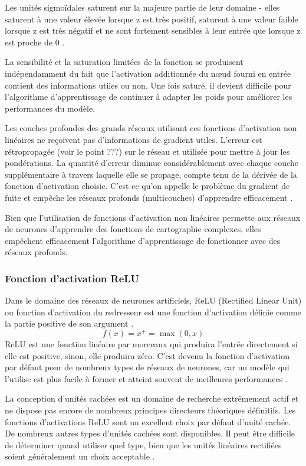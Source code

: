 	 Les unités sigmoïdales saturent sur la majeure partie de leur domaine - elles saturent à une valeur élevée lorsque z est très positif, saturent à une valeur faible lorsque z est très négatif et ne sont fortement sensibles à leur entrée que lorsque z est proche de 0 \cite{ml2008python}.
	 
	 La sensibilité et la saturation limitées de la fonction se produisent indépendamment du fait que l'activation additionnée du nœud fourni en entrée contient des informations utiles ou non. Une fois saturé, il devient difficile pour l'algorithme d'apprentissage de continuer à adapter les poids pour améliorer les performances du modèle.
	 
	 Les couches profondes des grands réseaux utilisant ces fonctions d'activation non linéaires ne reçoivent pas d'informations de gradient utiles. L'erreur est rétropropagée (voir le point ???) sur le réseau et utilisée pour mettre à jour les pondérations. La quantité d'erreur diminue considérablement avec chaque couche supplémentaire à travers laquelle elle se propage, compte tenu de la dérivée de la fonction d'activation choisie. C'est ce qu'on appelle le problème du gradient de fuite et empêche les réseaux profonds (multicouches) d'apprendre efficacement \cite{geron2017hands}.
	 
	 Bien que l'utilisation de fonctions d'activation non linéaires permette aux réseaux de neurones d'apprendre des fonctions de cartographie complexes, elles empêchent efficacement l'algorithme d'apprentissage de fonctionner avec des réseaux profonds.
	 
	
	
	\subsubsection{Fonction d'activation ReLU}
	
	Dans le domaine des réseaux de neurones artificiels, ReLU (Rectified Linear Unit) ou fonction d'activation du redresseur est une fonction d'activation définie comme la partie positive de son argument \cite{goodfellow2016deep}.
	$${\displaystyle f(x)=x^{+}=\max(0,x)}$$
	ReLU est une fonction linéaire par morceaux qui produira l'entrée directement si elle est positive, sinon, elle produira zéro. C'est devenu la fonction d'activation par défaut pour de nombreux types de réseaux de neurones, car un modèle qui l'utilise est plus facile à former et atteint souvent de meilleures performances \cite{geron2017hands}.
	
	
	La conception d'unités cachées est un domaine de recherche extrêmement actif et ne dispose pas encore de nombreux principes directeurs théoriques définitifs.
	Les fonctions d'activations ReLU sont un excellent choix par défaut d'unité cachée. De nombreux autres types d'unités cachées sont disponibles. Il peut être diﬃcile de déterminer quand utiliser quel type, bien que les unités linéaires rectiﬁées soient généralement un choix acceptable \cite{goodfellow2016deep}.
	
